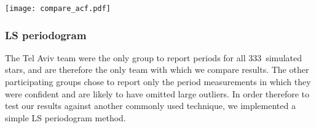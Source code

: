 \documentclass[a4paper,fleqn,usenatbib,useAMS]{mnras}
\newcommand{\naigrain}{333}
\begin{document}
\begin{figure*}
\begin{center}
\texttt{[image: compare\_acf.pdf]}
\caption[ACF results.]
{The `true' rotation periods used to generate \naigrain\ simulated light
curves vs the rotation periods measured using the ACF technique.
    Points are coloured by the peak-to-peak amplitude of the light curve, as
    defined in \citet{Aigrain2015}.
    Several light curves have drastically over- and under-estimated rotation
    periods.
    }
\label{fig:compare_acf}
\end{center}
\end{figure*}

\subsubsection{LS periodogram}
\label{sec:ls}

The \citet{Aigrain2015} Tel Aviv team were the only group to report periods
for all \naigrain\ simulated stars, and are therefore the only team with which
we compare results.
The other participating groups chose to report only the period measurements in
which they were confident and are likely to have omitted large outliers.
In order therefore to test our results against another commonly used
technique, we implemented a simple LS periodogram method.
\end{document}
